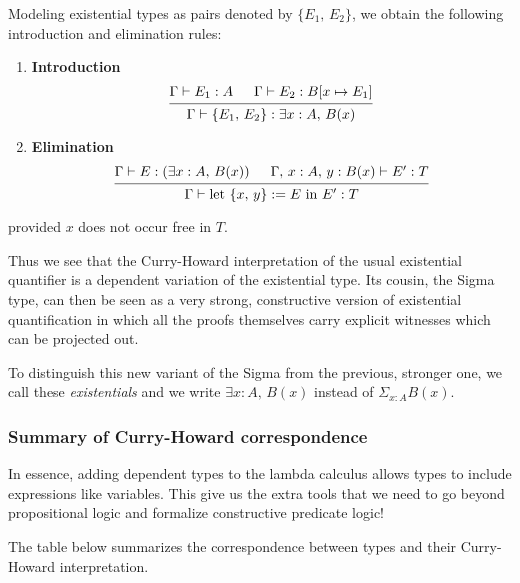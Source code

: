 \documentclass{article}
\begin{document}
Modeling existential types as pairs denoted by $\{E_1, \, E_2\}$, we obtain the
following introduction and elimination rules:

\begin{enumerate}
  \item \textbf{Introduction} \\
  \[
  \begin{prooftree}
    \hypo{\Gamma \vdash E_1 : A}
    \hypo{\Gamma \vdash E_2 : B[x \mapsto E_1]}
    \infer2{\Gamma \vdash \{E_1, \, E_2\} : \exists x : A, \, B(x)}
  \end{prooftree}
  \]
 
  \item \textbf{Elimination} \\
  \[
    \begin{prooftree}
      \hypo{\Gamma \vdash E : (\exists x : A, \, B(x)) }
      \hypo{\Gamma, \, x : A, \, y : B(x) \vdash E' : T}
      \infer2{\Gamma \vdash \text{let } \{x, \, y\} := E \text{ in } E' : T}
    \end{prooftree}
  \]
  \end{enumerate}
  provided $x$ does not occur free in $T$.

Thus we see that the Curry-Howard interpretation of the usual existential
quantifier is a dependent variation of the existential type. 
Its cousin, the Sigma type, can then
be seen as a very strong, constructive version of existential quantification in
which all the proofs themselves carry explicit witnesses which can be projected
out.

To distinguish this new variant of the Sigma from the previous, stronger one,
we call these \textit{existentials} and we write $\exists x : A, \, B(x)$ instead of 
$\Sigma_{x : A} B(x)$.

\subsubsection{Summary of Curry-Howard correspondence}
In essence, adding dependent types to the lambda calculus allows types to include
expressions like variables.
This give us the extra tools that we need to go beyond propositional logic and
formalize constructive predicate logic!

The table below summarizes the correspondence between types and their Curry-Howard
interpretation.
\end{document}
